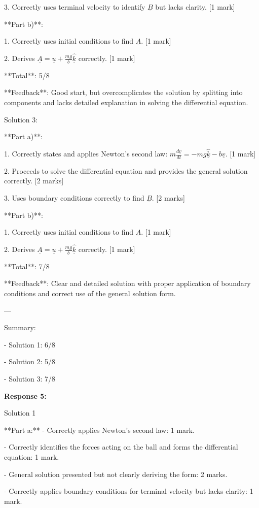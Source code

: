 \documentclass[a4paper,11pt]{article}
\begin{document}
3. Correctly uses terminal velocity to identify \(\underline{B}\) but lacks clarity. [1 mark]

**Part b)**:

1. Correctly uses initial conditions to find \( \underline{A} \). [1 mark]

2. Derives \( \underline{A} = \underline{u} + \frac{mg}{b} \hat{\underline{k}} \) correctly. [1 mark]

**Total**: 5/8

**Feedback**: Good start, but overcomplicates the solution by splitting into components and lacks detailed explanation in solving the differential equation.

Solution 3:

**Part a)**:

1. Correctly states and applies Newton's second law: \( m\frac{d\underline{v}}{dt} = - mg \hat{\underline{k}} - b\underline{v} \). [1 mark]

2. Proceeds to solve the differential equation and provides the general solution correctly. [2 marks]

3. Uses boundary conditions correctly to find \(\underline{B}\). [2 marks]

**Part b)**:

1. Correctly uses initial conditions to find \( \underline{A} \). [1 mark]

2. Derives \( \underline{A} = \underline{u} + \frac{mg}{b} \hat{\underline{k}} \) correctly. [1 mark]

**Total**: 7/8

**Feedback**: Clear and detailed solution with proper application of boundary conditions and correct use of the general solution form.

---

Summary:

- Solution 1: 6/8

- Solution 2: 5/8

- Solution 3: 7/8

\bigskip
\textbf{Response 5:}

Solution 1

**Part a:**
- Correctly applies Newton's second law: 1 mark.

- Correctly identifies the forces acting on the ball and forms the differential equation: 1 mark.

- General solution presented but not clearly deriving the form: 2 marks.

- Correctly applies boundary conditions for terminal velocity but lacks clarity: 1 mark.
\end{document}
